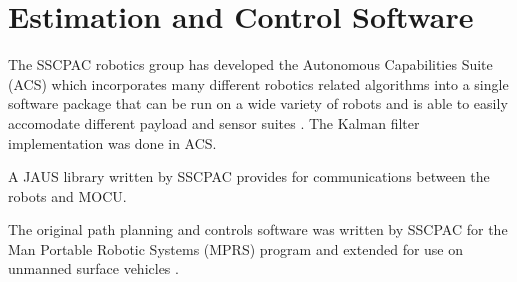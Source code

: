 \section{Estimation and Control Software}
\label{sec:bgSoftware}
The SSCPAC robotics group has developed the Autonomous Capabilities Suite (ACS) which incorporates many different robotics related algorithms into a single software package that can be run on a wide variety of robots and is able to easily accomodate different payload and sensor suites \cite{Sights06}. The Kalman filter implementation was done in ACS.

A JAUS library written by SSCPAC provides for communications between the robots and MOCU.

The original path planning and controls software was written by SSCPAC for the Man Portable Robotic Systems (MPRS) program \cite{Bruch02} and extended for use on unmanned surface vehicles \cite{Ebken05, Larson06, Larson07}.
